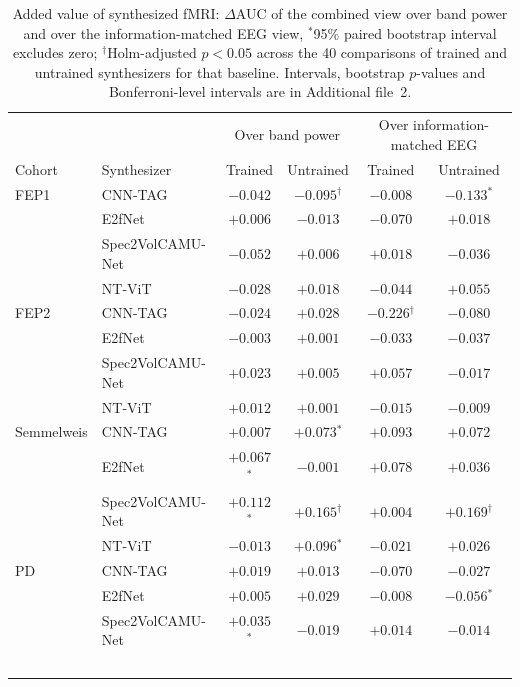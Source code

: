 \begin{table}[!htbp]
    \centering
    \caption{Added value of synthesized fMRI: $\Delta$AUC of the combined view over band power and over the information-matched EEG view, $^{*}$95\% paired bootstrap interval excludes zero; $^{\dagger}$Holm-adjusted $p<0.05$ across the 40 comparisons of trained and untrained synthesizers for that baseline. Intervals, bootstrap $p$-values and Bonferroni-level intervals are in Additional file~2.}
    \label{tab:delta}
    \scriptsize\setlength{\tabcolsep}{3pt}
    \begin{tabular}{@{}l l c c c c@{}}
        \hline
        & & \multicolumn{2}{c}{Over band power} & \multicolumn{2}{c}{Over information-matched EEG} \\
        Cohort & Synthesizer & Trained & Untrained & Trained & Untrained \\
        \hline
        FEP1 & CNN-TAG & $-0.042$ & $-0.095$$^{\dagger}$ & $-0.008$ & $-0.133$$^{*}$ \\
         & E2fNet & $+0.006$ & $-0.013$ & $-0.070$ & $+0.018$ \\
         & Spec2VolCAMU-Net & $-0.052$ & $+0.006$ & $+0.018$ & $-0.036$ \\
         & NT-ViT & $-0.028$ & $+0.018$ & $-0.044$ & $+0.055$ \\
        \hline
        FEP2 & CNN-TAG & $-0.024$ & $+0.028$ & $-0.226$$^{\dagger}$ & $-0.080$ \\
         & E2fNet & $-0.003$ & $+0.001$ & $-0.033$ & $-0.037$ \\
         & Spec2VolCAMU-Net & $+0.023$ & $+0.005$ & $+0.057$ & $-0.017$ \\
         & NT-ViT & $+0.012$ & $+0.001$ & $-0.015$ & $-0.009$ \\
        \hline
        Semmelweis & CNN-TAG & $+0.007$ & $+0.073$$^{*}$ & $+0.093$ & $+0.072$ \\
         & E2fNet & $+0.067$$^{*}$ & $-0.001$ & $+0.078$ & $+0.036$ \\
         & Spec2VolCAMU-Net & $+0.112$$^{*}$ & $+0.165$$^{\dagger}$ & $+0.004$ & $+0.169$$^{\dagger}$ \\
         & NT-ViT & $-0.013$ & $+0.096$$^{*}$ & $-0.021$ & $+0.026$ \\
        \hline
        PD & CNN-TAG & $+0.019$ & $+0.013$ & $-0.070$ & $-0.027$ \\
         & E2fNet & $+0.005$ & $+0.029$ & $-0.008$ & $-0.056$$^{*}$ \\
         & Spec2VolCAMU-Net & $+0.035$$^{*}$ & $-0.019$ & $+0.014$ & $-0.014$ \\
$$
\end{tabular}
\end{table}
